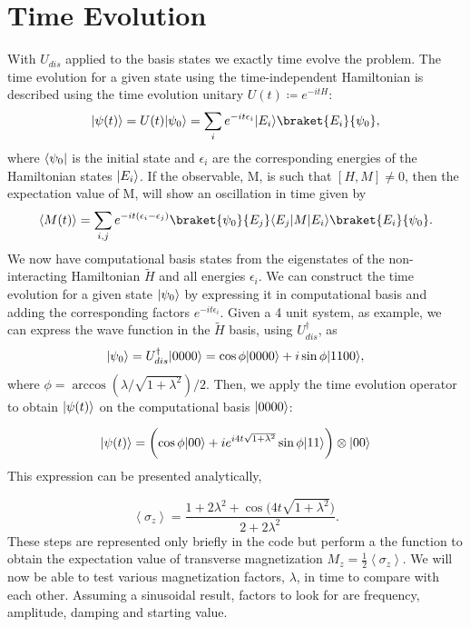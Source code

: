 \documentclass[12pt]{article}
\newcommand*{\eu}{e}
\DeclarePairedDelimiter{\bra}{\langle}{\rvert}
\DeclarePairedDelimiter{\ket}{\lvert}{\rangle}
\begin{document}
  \section{Time Evolution}
  With $U_{dis}$ applied to the basis states we exactly time evolve the problem. The time evolution for a given state using the time-independent Hamiltonian is described using the time evolution unitary $U(t) \coloneqq \eu^{-itH}$:
  \begin{equation}
    \ket{\psi(t)} = U(t)\ket{\psi_{0}} = \sum_{i} \eu^{-it\epsilon_{i}} \ket{E_{i}}\braket{E_{i}}{\psi_{0}},
  \end{equation}
  where $\bra{\psi_{0}}$ is the initial state and $\epsilon_{i}$ are the corresponding energies of the Hamiltonian states $\ket{E_{i}}$. If the observable, M, is such that $[H,M] \neq 0$, then the expectation value of M, will show an oscillation in time given by
  \begin{equation}
    \left\langle M(t)\right\rangle = \sum_{i,j}\eu^{-it(\epsilon_{i}-\epsilon_{j})}\braket{\psi_{0}}{E_{j}}\bra{E_{j}}M\ket{E_{i}}\braket{E_{i}}{\psi_{0}}.
  \end{equation}
  We now have computational basis states from the eigenstates of the non-interacting Hamiltonian $\tilde{H}$ and all energies $\epsilon_{i}$. We can construct the time evolution for a given state $\ket{\psi_{0}}$ by expressing it in computational basis and adding the corresponding factors $\eu^{-it\epsilon_{i}}$. Given a 4 unit system, as example, we can express the wave function in the $\tilde{H}$ basis, using $U_{dis}^{\dagger}$, as
  \begin{equation}
    \ket{\psi_{0}} = U_{dis}^{\dagger}\ket{0000} = \cos \phi\ket{0000} + i\sin \phi\ket{1100},
  \end{equation}
  where $\phi = \arccos(\lambda/\sqrt{1+\lambda ^2})/2$. Then, we apply the time evolution operator to obtain $\ket{\psi (t)}$ on the computational basis $\ket{0000}$:

  \begin{equation}
    \ket{\psi (t)} = \biggl( \cos \phi\ket{00} + i\eu^{i4t\sqrt{1+\lambda ^2}} \sin \phi \ket{11} \biggr) \otimes \ket{00}
  \end{equation}
  This expression can be presented analytically,

  \begin{equation}
    \left\langle \sigma_{z} \right\rangle = \frac{1 + 2\lambda ^2 + \cos \biggl( 4t\sqrt{1 + \lambda ^2}\biggr)}{2 + 2\lambda ^2}.
  \end{equation}
  These steps are represented only briefly in the code but perform a the function to obtain the expectation value of transverse magnetization $M_{z} = \frac{1}{2}\left\langle \sigma_{z}\right\rangle$. We will now be able to test various magnetization factors, $\lambda$, in time to compare with each other. Assuming a sinusoidal result, factors to look for are frequency, amplitude, damping and starting value. 
\end{document}
